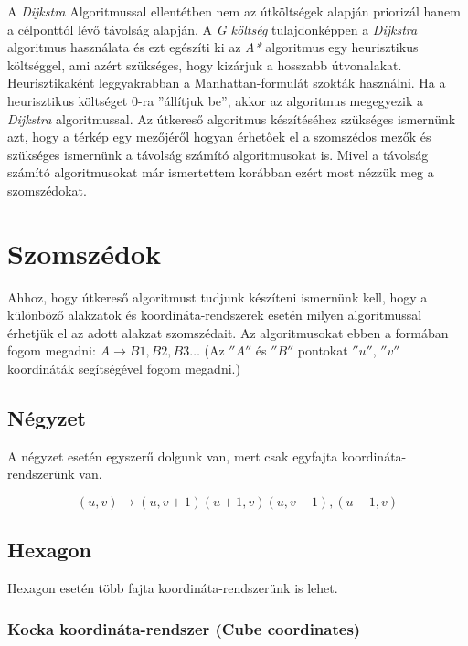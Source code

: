 \noindent A \textit{Dijkstra} Algoritmussal ellentétben nem az útköltségek alapján priorizál hanem a célponttól lévő távolság alapján.
\newline
\newline A \textit{G költség} tulajdonképpen a \textit{Dijkstra} algoritmus használata és ezt egészíti ki az \textit{A*} algoritmus egy heurisztikus költséggel, ami azért szükséges, hogy kizárjuk a hosszabb útvonalakat. Heurisztikaként leggyakrabban a Manhattan-formulát szokták használni. Ha a heurisztikus költséget 0-ra ''állítjuk be'', akkor az algoritmus megegyezik a \textit{Dijkstra} algoritmussal.
\newline
\newline Az útkereső algoritmus készítéséhez szükséges ismernünk azt, hogy a térkép egy mezőjéről hogyan érhetőek el a szomszédos mezők és szükséges ismernünk a távolság számító algoritmusokat is. Mivel a távolság számító algoritmusokat már ismertettem korábban ezért most nézzük meg a szomszédokat.

\section{Szomszédok}

Ahhoz, hogy útkereső algoritmust tudjunk készíteni ismernünk kell, hogy a különböző alakzatok és koordináta-rendszerek esetén milyen algoritmussal érhetjük el az adott alakzat szomszédait. 
\newline
\newline Az algoritmusokat ebben a formában fogom megadni: $A \rightarrow B1, B2, B3 …$
(Az $''A''$ és $''B''$ pontokat $''u''$, $''v''$ koordináták segítségével fogom megadni.)

\subsection{Négyzet}
A négyzet esetén egyszerű dolgunk van, mert csak egyfajta koordináta-rendszerünk van.

$$
(u,v) \rightarrow (u,v+1) (u+1,v) (u,v-1), (u-1,v)
$$

\subsection{Hexagon}

Hexagon esetén több fajta koordináta-rendszerünk is lehet.

\subsubsection{Kocka koordináta-rendszer (Cube coordinates)}

